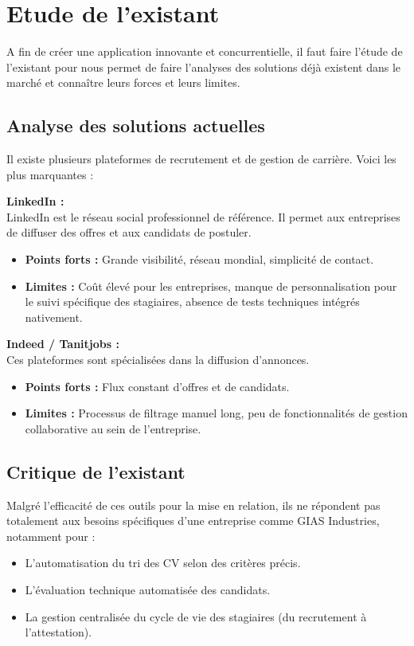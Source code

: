 \section{Etude de l'existant}
A fin de créer une application innovante et concurrentielle, il faut faire l'étude de l'existant pour nous permet de faire l'analyses des solutions déjà existent dans le marché et connaître leurs forces et leurs limites.

\subsection{Analyse des solutions actuelles}
Il existe plusieurs plateformes de recrutement et de gestion de carrière. Voici les plus marquantes :

\textbf{LinkedIn :} \\
LinkedIn est le réseau social professionnel de référence. Il permet aux entreprises de diffuser des offres et aux candidats de postuler.
\begin{itemize}
    \item \textbf{Points forts :} Grande visibilité, réseau mondial, simplicité de contact.
    \item \textbf{Limites :} Coût élevé pour les entreprises, manque de personnalisation pour le suivi spécifique des stagiaires, absence de tests techniques intégrés nativement.
\end{itemize}

\textbf{Indeed / Tanitjobs :} \\
Ces plateformes sont spécialisées dans la diffusion d'annonces.
\begin{itemize}
    \item \textbf{Points forts :} Flux constant d'offres et de candidats.
    \item \textbf{Limites :} Processus de filtrage manuel long, peu de fonctionnalités de gestion collaborative au sein de l'entreprise.
\end{itemize}

\subsection{Critique de l'existant}
Malgré l'efficacité de ces outils pour la mise en relation, ils ne répondent pas totalement aux besoins spécifiques d'une entreprise comme GIAS Industries, notamment pour :
\begin{itemize}
    \item L'automatisation du tri des CV selon des critères précis.
    \item L'évaluation technique automatisée des candidats.
    \item La gestion centralisée du cycle de vie des stagiaires (du recrutement à l'attestation).
\end{itemize}

